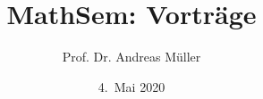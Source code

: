 %
%
%


\beamertemplatenavigationsymbolsempty
\title[Vorträge]{MathSem: Vorträge}
\author[A.~Müller]{Prof. Dr. Andreas Müller}
\date[]{4.~Mai 2020}

